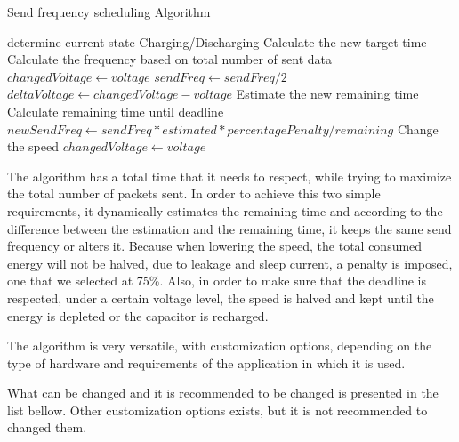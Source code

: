 \newcommand{\var}[1]{{\ttfamily#1}}%
\begin{algorithm}[t]
  \caption{Send frequency scheduling Algorithm}\label{euclid}
  \begin{algorithmic}[1]
    \Comment{}
    \State determine current state Charging/Discharging
        \State Calculate the new target time
        \State Calculate the frequency based on total number of sent data
        \State $changedVoltage \gets voltage$
    \EndIf
        \State $sendFreq \gets sendFreq / 2$
    \EndIf
    \State $deltaVoltage \gets changedVoltage - voltage$
        \State Estimate the new remaining time
        \State Calculate remaining time until deadline
        \State $newSendFreq \gets sendFreq*estimated*percentagePenalty/remaining $
            \State Change the speed
            \State $changedVoltage \gets voltage$
        \EndIf
    \EndIf
    \EndIf
    \EndProcedure
  \end{algorithmic}
\end{algorithm}


The algorithm has a total time that it needs to respect, while trying to maximize the total number
of packets sent. In order to achieve this two simple requirements, it dynamically estimates the
remaining time and according to the difference between the estimation and the remaining time, it
keeps the same send frequency or alters it. Because when lowering the speed, the total consumed
energy will not be halved, due to leakage and sleep current, a penalty is imposed,
one that we selected at 75\%. Also, in order to make sure that the deadline is respected, under a certain voltage level, the
speed is halved and kept until the energy is depleted or the capacitor is recharged.

The algorithm is very versatile, with customization options, depending on the type of hardware and
requirements of the application in which it is used.

What can be changed and it is recommended to be changed is presented in the list bellow.  Other
customization options exists, but it is not recommended to changed them.


